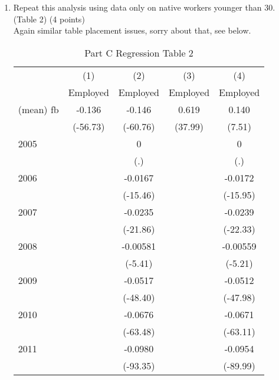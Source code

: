 \documentclass{article}
\begin{document}
\begin{enumerate}[label=\alph*]
\item Repeat this analysis using data only on native workers younger than 30. (Table
2) (4 points)\\
Again similar table placement issues, sorry about that, see below.\\
\begin{table}[htbp]\centering
\caption{Part C Regression Table 2\label{tab1}}
\begin{tabular}{l*{4}{c}}
\hline\hline
                    &\multicolumn{1}{c}{(1)}&\multicolumn{1}{c}{(2)}&\multicolumn{1}{c}{(3)}&\multicolumn{1}{c}{(4)}\\
                    &\multicolumn{1}{c}{Employed}&\multicolumn{1}{c}{Employed}&\multicolumn{1}{c}{Employed}&\multicolumn{1}{c}{Employed}\\
\hline
(mean) fb           &      -0.136&      -0.146&       0.619&       0.140\\
                    &    (-56.73)&    (-60.76)&     (37.99)&      (7.51)\\
[1em]
2005                &            &           0&            &           0\\
                    &            &         (.)&            &         (.)\\
[1em]
2006                &            &     -0.0167&            &     -0.0172\\
                    &            &    (-15.46)&            &    (-15.95)\\
[1em]
2007                &            &     -0.0235&            &     -0.0239\\
                    &            &    (-21.86)&            &    (-22.33)\\
[1em]
2008                &            &    -0.00581&            &    -0.00559\\
                    &            &     (-5.41)&            &     (-5.21)\\
[1em]
2009                &            &     -0.0517&            &     -0.0512\\
                    &            &    (-48.40)&            &    (-47.98)\\
[1em]
2010                &            &     -0.0676&            &     -0.0671\\
                    &            &    (-63.48)&            &    (-63.11)\\
[1em]
2011                &            &     -0.0980&            &     -0.0954\\
                    &            &    (-93.35)&            &    (-89.99)\\

\end{tabular}
\end{table}
\end{enumerate}
\end{document}
